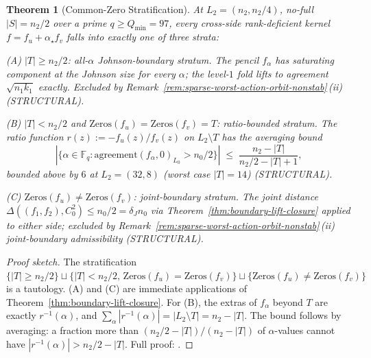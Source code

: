 \documentclass[11pt]{article}
\newtheorem{theorem}{Theorem}[section]
\theoremstyle{definition}
\theoremstyle{remark}
\newcommand{\FF}{\mathbb{F}}
\begin{document}
\begin{theorem}[Common-Zero Stratification]
\label{thm:common-zero-stratification}
At $L_2 = (n_2, n_2/4)$, no-full $|S| = n_2/2$ over a prime
$q \geq Q_{\min} = 97$, every cross-side rank-deficient kernel
$f = f_u + \alpha_\star f_v$ falls into exactly one of three strata:

(A) $|T| \geq n_2/2$: \emph{all-$\alpha$ Johnson-boundary stratum}.
    The pencil $f_\alpha$ has saturating component at the Johnson size
    for every $\alpha$; the level-$1$ fold lifts to agreement
    $\sqrt{n_1 k_1}$ exactly. Excluded by
    Remark~\ref{rem:sparse-worst-action-orbit-nonstab}\,(ii)
    \emph{(STRUCTURAL)}.

(B) $|T| < n_2/2$ and $\mathrm{Zeros}(f_u) = \mathrm{Zeros}(f_v) = T$:
    \emph{ratio-bounded stratum}. The ratio function $r(z) := -f_u(z)/f_v(z)$
    on $L_2 \setminus T$ has the averaging bound
    \[
     |\{\alpha \in \FF_q :
       \mathrm{agreement}(f_\alpha, 0)_{L_0} > n_0/2\}|
     \;\leq\; \frac{n_2 - |T|}{n_2/2 - |T| + 1},
    \]
    bounded above by $6$ at $L_2 = (32, 8)$ (worst case $|T| = 14$)
    \emph{(STRUCTURAL)}.

(C) $\mathrm{Zeros}(f_u) \neq \mathrm{Zeros}(f_v)$:
    \emph{joint-boundary stratum}.
    The joint distance $\Delta((f_1, f_2), C_0^2) \leq n_0/2 = \delta_J n_0$
    via Theorem~\ref{thm:boundary-lift-closure} applied to either side;
    excluded by Remark~\ref{rem:sparse-worst-action-orbit-nonstab}\,(ii)
    joint-boundary admissibility \emph{(STRUCTURAL)}.
\end{theorem}

\begin{proof}[Proof sketch]
The stratification $\{|T| \geq n_2/2\} \sqcup \{|T| < n_2/2,\,
\mathrm{Zeros}(f_u) = \mathrm{Zeros}(f_v)\} \sqcup \{\mathrm{Zeros}(f_u)
\neq \mathrm{Zeros}(f_v)\}$ is a tautology. (A) and (C) are immediate
applications of Theorem~\ref{thm:boundary-lift-closure}. For (B), the
extras of $f_\alpha$ beyond $T$ are exactly $r^{-1}(\alpha)$, and
$\sum_\alpha |r^{-1}(\alpha)| = |L_2 \setminus T| = n_2 - |T|$. The bound
follows by averaging: a fraction more than $(n_2/2 - |T|)/( n_2 - |T|)$
of $\alpha$-values cannot have $|r^{-1}(\alpha)| > n_2/2 - |T|$.
Full proof: \cite{CompanionRepo}.
\end{proof}
\end{document}
